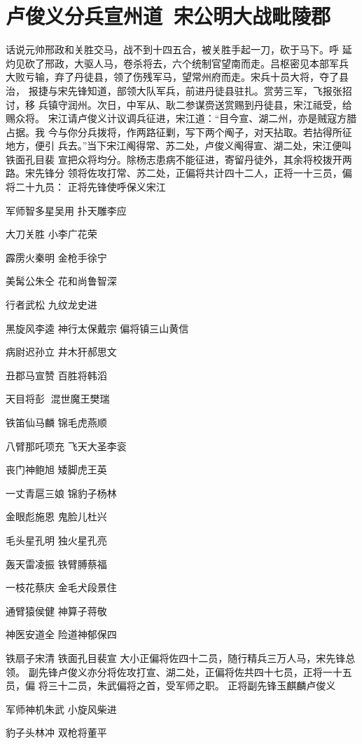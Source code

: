 \chapter{卢俊义分兵宣州道~宋公明大战毗陵郡}

话说元帅邢政和关胜交马，战不到十四五合，被关胜手起一刀，砍于马下。呼
延灼见砍了邢政，大驱人马，卷杀将去，六个统制官望南而走。吕枢密见本部军兵
大败亏输，弃了丹徒县，领了伤残军马，望常州府而走。宋兵十员大将，夺了县治，
报捷与宋先锋知道，部领大队军兵，前进丹徒县驻扎。赏劳三军，飞报张招讨，移
兵镇守润州。次日，中军从、耿二参谋赍送赏赐到丹徒县，宋江祗受，给赐众将。
宋江请卢俊义计议调兵征进，宋江道：“目今宣、湖二州，亦是贼寇方腊占据。我
今与你分兵拨将，作两路征剿，写下两个阄子，对天拈取。若拈得所征地方，便引
兵去。”当下宋江阄得常、苏二处，卢俊义阄得宣、湖二处，宋江便叫铁面孔目裴
宣把众将均分。除杨志患病不能征进，寄留丹徒外，其余将校拨开两路。宋先锋分
领将佐攻打常、苏二处，正偏将共计四十二人，正将一十三员，偏将二十九员：
正将先锋使呼保义宋江

军师智多星吴用
扑天雕李应


大刀关胜
小李广花荣


霹雳火秦明
金枪手徐宁


美髯公朱仝
花和尚鲁智深

行者武松
九纹龙史进


黑旋风李逵
神行太保戴宗
偏将镇三山黄信


病尉迟孙立
井木犴郝思文

丑郡马宣赞
百胜将韩滔


天目将彭
混世魔王樊瑞

铁笛仙马麟
锦毛虎燕顺


八臂那吒项充
飞天大圣李衮

丧门神鲍旭
矮脚虎王英


一丈青扈三娘
锦豹子杨林


金眼彪施恩
鬼脸儿杜兴


毛头星孔明
独火星孔亮


轰天雷凌振
铁臂膊蔡福


一枝花蔡庆
金毛犬段景住

通臂猿侯健
神算子蒋敬


神医安道全
险道神郁保四

铁扇子宋清
铁面孔目裴宣
大小正偏将佐四十二员，随行精兵三万人马，宋先锋总领。
副先锋卢俊义亦分将佐攻打宣、湖二处，正偏将佐共四十七员，正将一十五员，偏
将三十二员，朱武偏将之首，受军师之职。
正将副先锋玉麒麟卢俊义

军师神机朱武
小旋风柴进


豹子头林冲
双枪将董平


